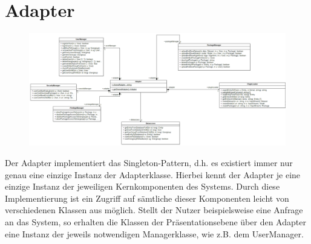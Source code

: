 \section{Adapter}

\begin{figure}[h]
\centering
\includegraphics[width=1.0\linewidth]{Grafik/Klassendiagramme/adapter.png}
\end{figure}

Der Adapter implementiert das Singleton-Pattern, d.h. es existiert immer nur genau eine einzige Instanz der Adapterklasse. Hierbei kennt der Adapter je eine einzige Instanz der jeweiligen Kernkomponenten des Systems. Durch diese Implementierung ist ein Zugriff auf sämtliche dieser Komponenten leicht von verschiedenen Klassen aus möglich. Stellt der Nutzer beispielsweise eine Anfrage an das System, so erhalten die Klassen der Präsentationsebene über den Adapter eine Instanz der jeweils notwendigen Managerklasse, wie z.B. dem UserManager.